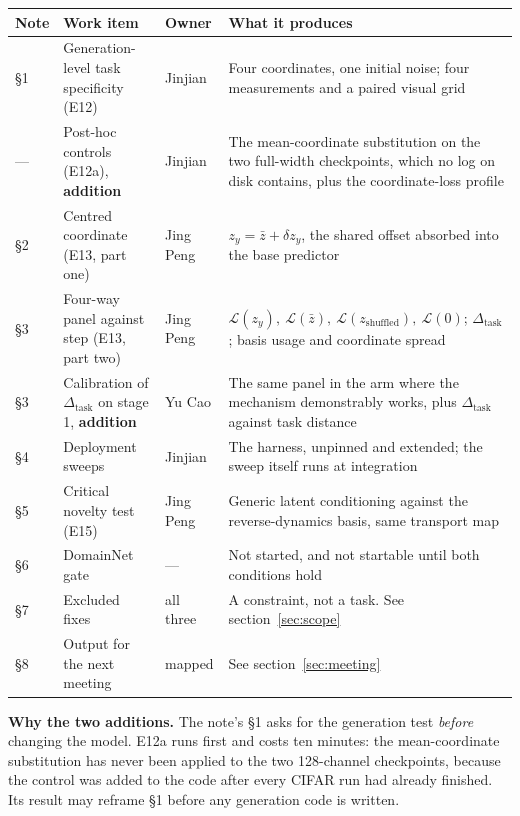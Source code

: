 \documentclass[11pt]{article}
\newcommand{\dtask}{\Delta_{\mathrm{task}}}
\newcommand{\add}{\textcolor{addition}{\textbf{addition}}}
\begin{document}
\vspace{0.6em}
\noindent
\begin{tabularx}{\textwidth}{@{}l L{3.4cm} l X@{}}
\toprule
\textbf{Note} & \textbf{Work item} & \textbf{Owner} & \textbf{What it produces} \\
\midrule
\S1 & Generation-level task specificity (E12) & Jinjian &
  Four coordinates, one initial noise; four measurements and a paired visual grid \\
\addlinespace[2pt]
--- & Post-hoc controls (E12a), \add & Jinjian &
  The mean-coordinate substitution on the two full-width checkpoints, which no log on
  disk contains, plus the coordinate-loss profile \\
\addlinespace[2pt]
\S2 & Centred coordinate (E13, part one) & Jing Peng &
  $z_y = \bar z + \delta z_y$, the shared offset absorbed into the base predictor \\
\addlinespace[2pt]
\S3 & Four-way panel against step (E13, part two) & Jing Peng &
  $\mathcal{L}(z_y),\ \mathcal{L}(\bar z),\ \mathcal{L}(z_{\mathrm{shuffled}}),\
  \mathcal{L}(0)$; $\dtask$; basis usage and coordinate spread \\
\addlinespace[2pt]
\S3 & Calibration of $\dtask$ on stage 1, \add & Yu Cao &
  The same panel in the arm where the mechanism demonstrably works, plus $\dtask$
  against task distance \\
\addlinespace[2pt]
\S4 & Deployment sweeps & Jinjian &
  The harness, unpinned and extended; the sweep itself runs at integration \\
\addlinespace[2pt]
\S5 & Critical novelty test (E15) & Jing Peng &
  Generic latent conditioning against the reverse-dynamics basis, same transport map \\
\addlinespace[2pt]
\S6 & DomainNet gate & --- &
  Not started, and not startable until both conditions hold \\
\addlinespace[2pt]
\S7 & Excluded fixes & all three &
  A constraint, not a task. See section~\ref{sec:scope} \\
\addlinespace[2pt]
\S8 & Output for the next meeting & mapped &
  See section~\ref{sec:meeting} \\
\bottomrule
\end{tabularx}

\vspace{0.8em}

\noindent\textbf{Why the two additions.}
The note's \S1 asks for the generation test \emph{before} changing the model. E12a runs
first and costs ten minutes: the mean-coordinate substitution has never been applied to
the two 128-channel checkpoints, because the control was added to the code after every
CIFAR run had already finished. Its result may reframe \S1 before any generation code is
written.
\end{document}
